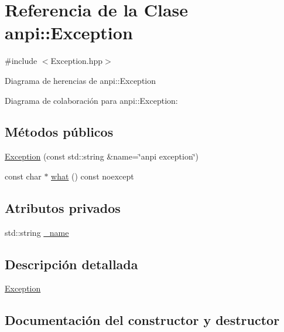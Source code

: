 \hypertarget{classanpi_1_1Exception}{}\section{Referencia de la Clase anpi\+:\+:Exception}
\label{classanpi_1_1Exception}


{\ttfamily \#include $<$Exception.\+hpp$>$}



Diagrama de herencias de anpi\+:\+:Exception


Diagrama de colaboración para anpi\+:\+:Exception\+:
\subsection*{Métodos públicos}
\begin{DoxyCompactItemize}
\item 
\hyperlink{classanpi_1_1Exception_a6f39b4facd75daa7763fdce3314ee233}{Exception} (const std\+::string \&name=\char`\"{}anpi exception\char`\"{})
\item 
const char $\ast$ \hyperlink{classanpi_1_1Exception_a58705160e813607d2ac15cfe0563aab0}{what} () const noexcept
\end{DoxyCompactItemize}
\subsection*{Atributos privados}
\begin{DoxyCompactItemize}
\item 
std\+::string \hyperlink{classanpi_1_1Exception_a02643d1cc10e5b41709aae76b2be5b08}{\+\_\+name}
\end{DoxyCompactItemize}


\subsection{Descripción detallada}
\hyperlink{classanpi_1_1Exception}{Exception} 

\subsection{Documentación del constructor y destructor}
\mbox{\label{classanpi_1_1Exception_a6f39b4facd75daa7763fdce3314ee233}} 
